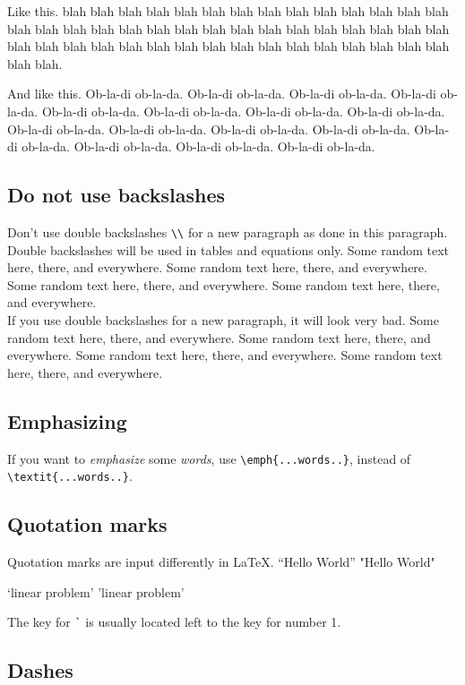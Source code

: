 \documentclass[letterpaper, 11pt]{article}
\newenvironment{example}
 {\VerbatimOut{\jobname.tmp}}
 {\endVerbatimOut
 \begin{center}
 \fbox{
	 \begin{minipage}[c]{0.48\textwidth}
	  
	 \end{minipage}
   }
 \fbox{
 	\begin{minipage}[c]{0.38\textwidth}
 	 \scriptsize
	 
  	\end{minipage}
  }
  \end{center}
 }
\begin{document}
Like this. blah blah blah blah blah blah blah blah blah blah blah blah blah blah blah blah blah blah blah blah blah blah blah blah blah blah blah blah blah blah blah blah blah blah blah blah blah blah blah blah blah blah blah blah blah blah blah blah.

And like this.
Ob-la-di ob-la-da.
Ob-la-di ob-la-da.
Ob-la-di ob-la-da.
Ob-la-di ob-la-da.
Ob-la-di ob-la-da.
Ob-la-di ob-la-da.
Ob-la-di ob-la-da.
Ob-la-di ob-la-da.
Ob-la-di ob-la-da.
Ob-la-di ob-la-da.
Ob-la-di ob-la-da.
Ob-la-di ob-la-da.
Ob-la-di ob-la-da.
Ob-la-di ob-la-da.
Ob-la-di ob-la-da.
Ob-la-di ob-la-da.


\subsection{Do not use backslashes}

Don't use double backslashes \verb|\\| for a new paragraph as done in this paragraph.
Double backslashes will be used in tables and equations only.
Some random text here, there, and everywhere.
Some random text here, there, and everywhere.
Some random text here, there, and everywhere.
Some random text here, there, and everywhere.  \\
If you use double backslashes for a new paragraph, it will look very bad.
Some random text here, there, and everywhere.
Some random text here, there, and everywhere.
Some random text here, there, and everywhere.
Some random text here, there, and everywhere.

\subsection{Emphasizing}
If you want to \emph{emphasize} some \emph{words}, use \verb|\emph{...words..}|, instead of \verb|\textit{...words..}|.

\subsection{Quotation marks}

Quotation marks are input differently in LaTeX.
\begin{example}
``Hello World''
"Hello World"

`linear problem'
'linear problem'
\end{example}
The key for \verb|`| is usually located left to the key for number 1.


\subsection{Dashes}
\end{document}
